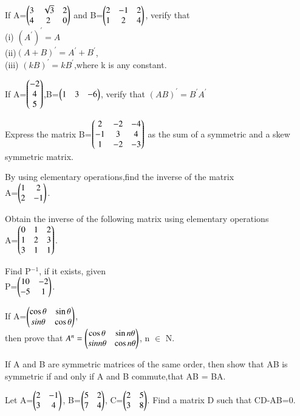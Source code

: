 \item If A=$\begin{pmatrix}3 &\sqrt{3} &2\\4 &2 &0\end{pmatrix}$ and B=$\begin{pmatrix}2 &-1 &2\\1 &2 &4\end{pmatrix}$, verify that\\
(i) $(A^{'})^{'}=A$\\ (ii)$(A+B)^{'}=A^{'}+B^{'}$,\\ (iii) $(kB)^{'}=kB^{'}$,where k is any constant.\\
\item If A=$\begin{pmatrix}-2\\4 \\5\end{pmatrix}$,B=$\begin{pmatrix}1 &3 &-6\end{pmatrix}$, verify that $(AB)^{'}=B^{'}A^{'}$\\
\item Express the matrix B=$\begin{pmatrix}2 &-2 &-4\\-1 &3 &4\\1 &-2 &-3\end{pmatrix}$ as the sum of a symmetric and a skew symmetric matrix.\\
\item By using elementary operations,find the inverse of the matrix\\
A=$\begin{pmatrix}1 &2\\2 &-1\end{pmatrix}$.\\
\item Obtain the inverse of the following matrix using elementary operations\\
A=$\begin{pmatrix}0 &1 &2\\1 &2 &3\\3 &1 &1\end{pmatrix}$.\\
\item Find P$^{-1}$, if it exists, given \\
P=$\begin{pmatrix}10 &-2\\-5 &1\end{pmatrix}$.\\
\item If A=$\begin{pmatrix}\cos\theta &\sin\theta\\ \-sin\theta &\cos\theta\end{pmatrix}$,\\then prove that $A^{n}=\begin{pmatrix}\cos\theta &\sin n\theta\\\-sin n\theta &\cos n\theta\end{pmatrix}$, n $\in$ N.\\
\item If A and B are symmetric matrices of the same order, then show that AB is symmetric if and only if A and B commute,that AB = BA.\\
\item Let A=$\begin{pmatrix}2 &-1\\3 &4\end{pmatrix}$, B=$\begin{pmatrix}5 &2\\7 &4\end{pmatrix}$, C=$\begin{pmatrix}2 &5\\3 &8\end{pmatrix}$. Find a matrix D such that CD-AB=0. 
